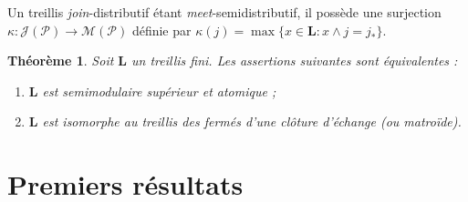 \documentclass[leqno, 12pt]{amsart}
\numberwithin{equation}{section}
\newtheorem{thm}{Théorème}[section]
\renewcommand{\L}{\mathbf L}
\newcommand{\Pos}{\mathcal P}
\newcommand{\JIrr}{\mathcal J}
\newcommand{\MIrr}{\mathcal M}
\begin{document}
Un treillis \emph{join}-distributif étant \emph{meet}-semidistributif, il possède une surjection $\kappa:\JIrr(\Pos)\to \MIrr(\Pos)$ définie par $\kappa(j)=\max\{x\in \L:x\wedge j=j_*\}$.


\begin{thm}
  Soit $\L$ un treillis fini. Les assertions suivantes sont équivalentes :
   \begin{enumerate}
   \item $\L$ est semimodulaire supérieur et atomique ;
   \item $\L$ est isomorphe au treillis des fermés d'une clôture d'échange (ou matroïde).
   \end{enumerate}
\end{thm}


\section{Premiers résultats}
\end{document}

